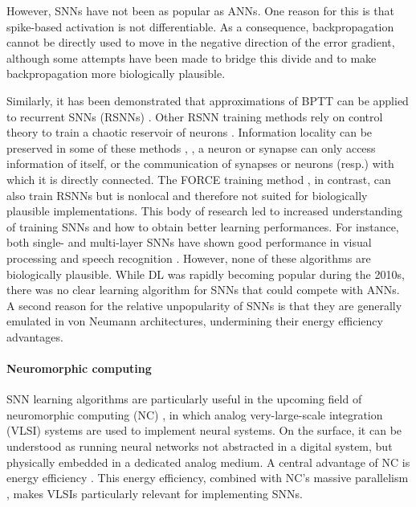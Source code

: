 However, SNNs have not been as popular as ANNs.
One reason for this is that spike-based activation is not differentiable.
As a consequence, backpropagation cannot be directly used to move in the negative direction of the error gradient, although some attempts have been made to bridge this divide \citep{bohte2002error,hong2010cooperative,xu2013supervised,ourdighi2016efficient,lee2016training,sacramento2018dendritic,bellec2019biologically,whittington2019theories} and to make backpropagation more biologically plausible.

Similarly, it has been demonstrated that approximations of BPTT can be applied to recurrent SNNs (RSNNs) \citep{huh2017gradient,bellec2018long}.
Other RSNN training methods rely on control theory to train a chaotic reservoir of neurons \citep{thalmeier2016learning,gilra2017predicting}.
Information locality can be preserved in some of these methods \citep{alemi2018learning}, \ie, a neuron or synapse can only access information of itself, or the communication of synapses or neurons (resp.) with which it is directly connected.
The FORCE training method \citep{nicola2017supervised}, in contrast, can also train RSNNs but is nonlocal and therefore not suited for biologically plausible implementations.
This body of research led to increased understanding of training SNNs and how to obtain better learning performances.
For instance, both single- and multi-layer SNNs have shown good performance in visual processing \citep{escobar2009action,kheradpisheh2018stdp,liu2017fast} and speech recognition \citep{tavanaei2017bio,dong2018unsupervised}.
However, none of these algorithms are biologically plausible.
While DL was rapidly becoming popular during the 2010s, there was no clear learning algorithm for SNNs that could compete with ANNs.
A second reason for the relative unpopularity of SNNs is that they are generally emulated in von Neumann architectures, undermining their energy efficiency advantages.

\paragraph{Neuromorphic computing}  %
SNN learning algorithms are particularly useful in the upcoming field of neuromorphic computing (NC) \citep{mitra2008real}, in which analog very-large-scale integration (VLSI) systems are used to implement neural systems.
On the surface, it can be understood as running neural networks not abstracted in a digital system, but physically embedded in a dedicated analog medium.
A central advantage of NC is energy efficiency \citep{hasler1990vlsi,lee1990parallel,tarassenko1990real}.
This energy efficiency, combined with NC's massive parallelism \citep{monroe2014neuromorphic}, makes VLSIs particularly relevant for implementing SNNs.


